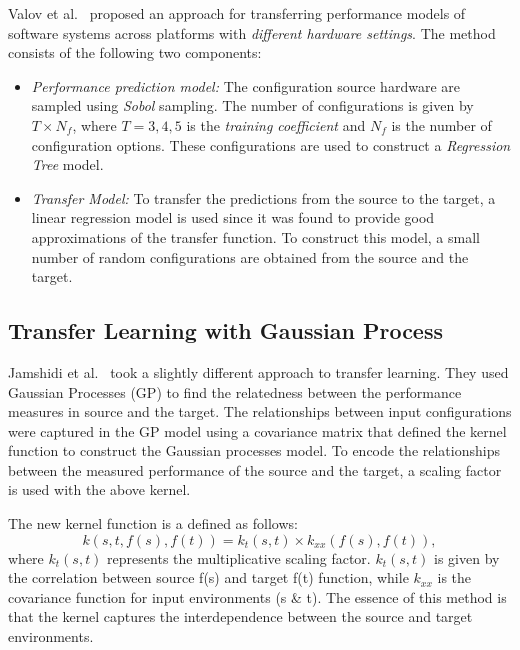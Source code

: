 \documentclass[10pt,journal,compsoc]{IEEEtran}
\newcommand{\bi}{\begin{itemize}}
\newcommand{\ei}{\end{itemize}}
\begin{document}
Valov et al.~\cite{valov2017transferring} proposed an approach for transferring performance models of software systems across platforms with \textit{different hardware settings}. The method consists of the following two components: 
\bi
\item \textit{Performance prediction model:} The configuration source hardware are sampled using \textit{Sobol} sampling. The number of configurations is given by $T\times N_f$, where $T={3, 4, 5}$ is the \textit{training coefficient} and $N_f$ is the number of configuration options. These configurations are used to construct a \textit{Regression Tree} model.
\item \textit{Transfer Model:} To transfer the predictions from the source to the target, a linear regression model is used since it was found to provide good approximations of the transfer function. To construct this model, a small number of random configurations are obtained from the source and the target. 
\ei

\vspace{-0.2cm}
\subsection{Transfer Learning with Gaussian Process} 


Jamshidi et al.~\cite{jamshidi2017transfer} took a slightly different approach to transfer learning. They used Gaussian Processes (GP) to find the relatedness between the performance measures in source and the target. The relationships between input configurations were
captured in the GP model using a covariance matrix that
defined the kernel function to construct the Gaussian processes model. To encode the relationships between the measured performance of the source and the target, a scaling factor is used with the above kernel. 

% 
% 


The new kernel function is a defined as follows:
\begin{equation}
    k(s, t, f(s), f(t)) = k_t(s, t) \times k_{xx}(f(s), f(t)),
\end{equation}\label{eq:gpkernel}
where $k_t(s,t)$ represents the multiplicative scaling factor. $k_t(s,t)$ is given by the correlation between source f(s) and target f(t) function, while $k_{xx}$ is the covariance function for input environments (s \& t). The essence of this method is that the kernel captures the interdependence  between the source and target environments. 
\vspace{-0.2cm}
\end{document}
